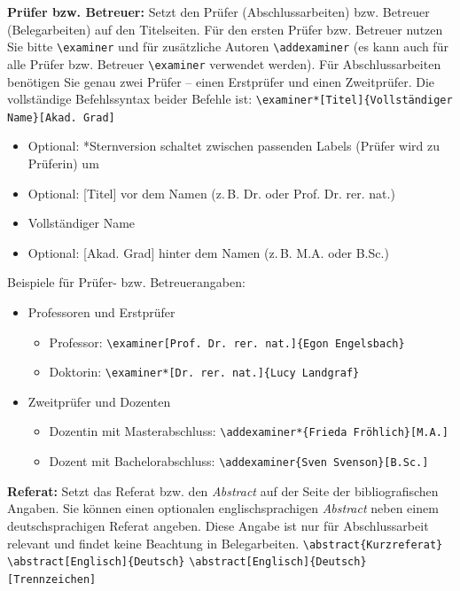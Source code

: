 	\textbf{Prüfer bzw. Betreuer:}\label{cmd:examiner}
	Setzt den Prüfer (Abschlussarbeiten) bzw. Betreuer (Belegarbeiten) auf den Titelseiten.
	Für den ersten Prüfer bzw. Betreuer nutzen Sie bitte \verb|\examiner| und für zusätzliche Autoren \verb|\addexaminer| (es kann auch für alle Prüfer bzw. Betreuer \verb|\examiner| verwendet werden).
	Für Abschlussarbeiten benötigen Sie genau zwei Prüfer --  einen Erstprüfer und einen Zweitprüfer.
	Die vollständige Befehlssyntax beider Befehle ist:
	\newline
	\verb|\examiner*[Titel]{Vollständiger Name}[Akad. Grad]|
	\begin{itemize}
		\item Optional: *Sternversion schaltet zwischen passenden Labels (Prüfer wird zu Prüferin) um
		\item Optional: [Titel] vor dem Namen (z.\,B. Dr. oder Prof. Dr. rer. nat.)
		\item Vollständiger Name
		\item Optional: [Akad. Grad] hinter dem Namen (z.\,B. M.A. oder B.Sc.)
	\end{itemize}\vspace*{-\baselineskip}
	Beispiele für Prüfer- bzw. Betreuerangaben:
	\begin{itemize}
		\item Professoren und Erstprüfer
		\begin{itemize}
			\item Professor: \verb|\examiner[Prof. Dr. rer. nat.]{Egon Engelsbach}|
			\item Doktorin: \verb|\examiner*[Dr. rer. nat.]{Lucy Landgraf}|
		\end{itemize}
		\item Zweitprüfer und Dozenten
		\begin{itemize}
			\item Dozentin mit Masterabschluss: \verb|\addexaminer*{Frieda Fröhlich}[M.A.]|
			\item Dozent mit Bachelorabschluss: \verb|\addexaminer{Sven Svenson}[B.Sc.]|
		\end{itemize}
	\end{itemize}
	
	\textbf{Referat:}\label{cmd:abstract}
	Setzt das Referat bzw. den \textit{Abstract} auf der Seite der bibliografischen Angaben.
	Sie können einen optionalen englischsprachigen \textit{Abstract} neben einem deutschsprachigen Referat angeben.
	Diese Angabe ist nur für Abschlussarbeit relevant und findet keine Beachtung in Belegarbeiten.
	\newline
	\verb|\abstract{Kurzreferat}|
	\newline
	\verb|\abstract[Englisch]{Deutsch}|
	\newline
	\verb|\abstract[Englisch]{Deutsch}[Trennzeichen]|
	
